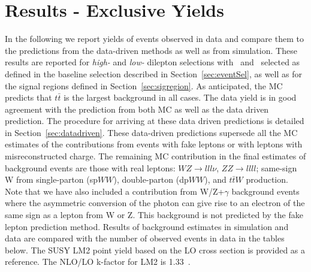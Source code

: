 \section{Results - Exclusive Yields}
\label{sec:yields_exclusive}


In the following we report yields of events observed in data and compare them to the predictions
from the data-driven methods as well as from simulation.
These results are reported for {\em high-\pt} and {\em low-\pt} dilepton selections
with \Ht\ and \met\ selected as defined in the baseline selection described in Section~\ref{sec:eventSel},
as well as for the signal regions defined in Section~\ref{sec:sigregion}.
As anticipated, the MC predicts that $t\bar{t}$ is the largest background in all cases.
The data yield is in good agreement with the prediction from both MC as well as the data driven prediction.
The procedure for arriving at these data driven predictions is detailed in Section~\ref{sec:datadriven}.
These data-driven predictions supersede all the MC estimates of the contributions
from events with fake leptons or with leptons with misreconstructed charge.
The remaining MC contribution in the final estimates of background events are those with real leptons:
$WZ\to lll\nu$, $ZZ\to llll$; same-sign W from single-parton (sp$WW$), double-parton (dp$WW$), and $t\bar{t}W$ production.
Note that we have also included a  contribution from W/Z+$\gamma$ background events
where the asymmetric conversion of the photon can give rise to an electron of the same sign as a lepton from W or Z.
This background is not predicted by the fake lepton prediction method.
Results of background estimates in simulation and data are compared with the number of observed events in data 
in the tables below.
The SUSY LM2 point yield based on the LO cross section is provided as a reference.
The NLO/LO k-factor for LM2 is 1.33~\cite{ref:susyMCtwiki}.


